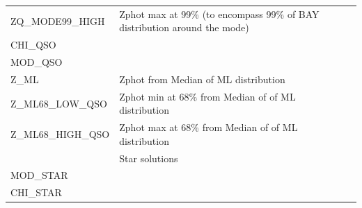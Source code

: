 \documentclass[12pt]{article}
\begin{document}
\begin{tabular}{llll}
ZQ\_MODE99\_HIGH   &   Zphot max at 99\% (to encompass 99\% of BAY distribution around the mode)  \\ 
CHI\_QSO              &         \\
MOD\_QSO           &      \\
Z\_ML            &   Zphot from Median of ML distribution \\
Z\_ML68\_LOW\_QSO     &   Zphot min at 68\% from Median of of ML distribution  \\ 
Z\_ML68\_HIGH\_QSO    &   Zphot max at 68\% from Median of of ML distribution  \\ 
\hline
     &   Star solutions   \\
\hline
MOD\_STAR   &     \\
CHI\_STAR     &   \\
\hline 
\hline 
\end{tabular}
\end{document}
